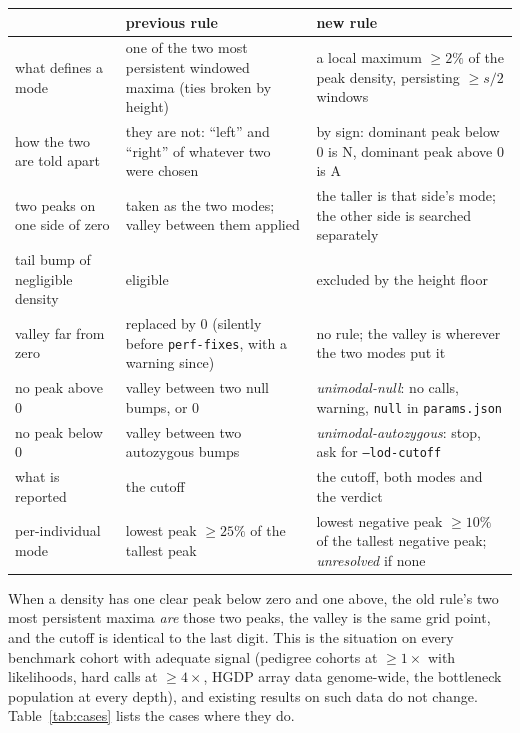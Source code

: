 \documentclass[11pt]{article}
\newcommand{\code}[1]{\texttt{#1}}
\begin{document}
\begin{center}\small
\begin{tabular}{p{}p{}p{}}
\toprule
 & previous rule & new rule \\
\midrule
what defines a mode & one of the two most persistent windowed maxima (ties broken by height) & a local maximum $\ge 2\%$ of the peak density, persisting $\ge s/2$ windows \\
how the two are told apart & they are not: ``left'' and ``right'' of whatever two were chosen & by sign: dominant peak below 0 is N, dominant peak above 0 is A \\
two peaks on one side of zero & taken as the two modes; valley between them applied & the taller is that side's mode; the other side is searched separately \\
tail bump of negligible density & eligible & excluded by the height floor \\
valley far from zero & replaced by 0 (silently before \code{perf-fixes}, with a warning since) & no rule; the valley is wherever the two modes put it \\
no peak above 0 & valley between two null bumps, or 0 & \emph{unimodal-null}: no calls, warning, \code{null} in \code{params.json} \\
no peak below 0 & valley between two autozygous bumps & \emph{unimodal-autozygous}: stop, ask for \code{--lod-cutoff} \\
what is reported & the cutoff & the cutoff, both modes and the verdict \\
per-individual mode & lowest peak $\ge 25\%$ of the tallest peak & lowest negative peak $\ge 10\%$ of the tallest negative peak; \emph{unresolved} if none \\
\bottomrule
\end{tabular}
\end{center}

When a density has one clear peak below zero and one above, the old rule's two most persistent maxima \emph{are} those two peaks, the valley is the same grid point, and the cutoff is identical to the last digit. This is the situation on every benchmark cohort with adequate signal (pedigree cohorts at $\ge1\times$ with likelihoods, hard calls at $\ge4\times$, HGDP array data genome-wide, the bottleneck population at every depth), and existing results on such data do not change. Table~\ref{tab:cases} lists the cases where they do.
\end{document}
